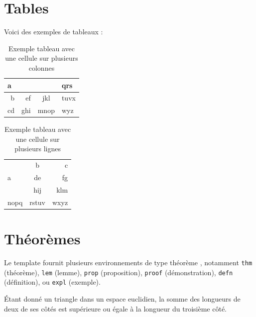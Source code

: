 \documentclass[a4paper, 12pt]{report}
\begin{document}
    \section{Tables}

    Voici des exemples de tableaux :

    \begin{table}[H]
        \centering
        \begin{tabular}{|r|r|c|l|}
            \hline
            \multicolumn{3}{|l|}{a} & qrs  \\ \hline
             b &  ef &     jkl      & tuvx \\ \hline
            cd & ghi &     mnop     & wyz  \\ \hline
        \end{tabular}
        \caption{Exemple tableau avec une cellule sur plusieurs colonnes}
        \label{tab:multicol_example}
    \end{table}

    \begin{table}[H]
        \centering
        \begin{tabular}{|l|c|r|}
            \hline
            \multirow{3}{2cm}{a} &   b   &    c \\ \cline{2-3}
                                 &  de   &   fg \\ \cline{2-3}
                                 &  hij  &  klm \\ \hline
            nopq                 & rstuv & wxyz \\ \hline
        \end{tabular}
        \caption{Exemple tableau avec une cellule sur plusieurs lignes}
        \label{tab:multirow_example}
    \end{table}

    \section{Théorèmes}
    Le template fournit plusieurs environnements de type \og théorème \fg, notamment \verb+thm+ (théorème), \verb+lem+ (lemme), \verb+prop+ (proposition), \verb+proof+ (démonstration), \verb+defn+ (définition), ou \verb+expl+ (exemple).

    \begin{thm}
        Étant donné un triangle dans un espace euclidien, la somme des longueurs de deux de ses côtés est supérieure ou égale à la longueur du troisième côté.
    \end{thm}
\end{document}
